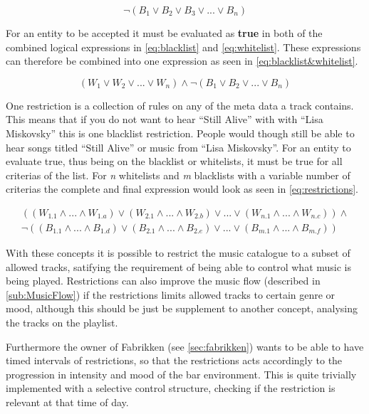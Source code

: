 \begin{equation}
\label{eq:blacklist}
	\neg(B_1 \vee B_2 \vee B_3 \vee ... \vee B_n)
\end{equation}

For an entity to be accepted it must be evaluated as \textbf{true} in both of the combined logical expressions in \cref{eq:blacklist} and \cref{eq:whitelist}. These expressions can therefore be combined into one expression as seen in \cref{eq:blacklist&whitelist}.

\begin{equation}
\label{eq:blacklist&whitelist}
		(W_1 \vee W_2 \vee ... \vee W_n) \wedge \neg(B_1 \vee B_2 \vee ... \vee B_n)
\end{equation}

One restriction is a collection of rules on any of the meta data a track contains. This means that if you do not want to hear \enquote{Still Alive} with with \enquote{Lisa Miskovsky} this is one blacklist restriction. People would though still be able to hear songs titled \enquote{Still Alive} or music from \enquote{Lisa Miskovsky}. For an entity to evaluate true, thus being on the blacklist or whitelists, it must be true for all criterias of the list. For \emph{n} whitelists and \emph{m} blacklists with a variable number of criterias the complete and final expression would look as seen in \cref{eq:restrictions}.

\begin{eqnarray}
	\label{eq:restrictions}
	((W_{1.1} \wedge ... \wedge W_{1.a}) \vee (W_{2.1} \wedge ... \wedge W_{2.b}) \vee ... \vee (W_{n.1} \wedge ... \wedge W_{n.c})) \wedge \nonumber \\ \neg((B_{1.1} \wedge ... \wedge B_{1.d}) \vee (B_{2.1} \wedge ... \wedge B_{2.e}) \vee ... \vee (B_{m.1} \wedge ... \wedge B_{m.f}))
\end{eqnarray}

With these concepts it is possible to restrict the music catalogue to a subset of allowed tracks, satifying the requirement of being able to control what music is being played. Restrictions can also improve the music flow (described in \cref{sub:MusicFlow}) if the restrictions limits allowed tracks to certain genre or mood, although this should be just be supplement to another concept, analysing the tracks on the playlist.

Furthermore the owner of Fabrikken (see \cref{sec:fabrikken}) wants to be able to have timed intervals of restrictions, so that the restrictions acts accordingly to the progression in intensity and mood of the bar environment. This is quite trivially implemented with a selective control structure, checking if the restriction is relevant at that time of day.


